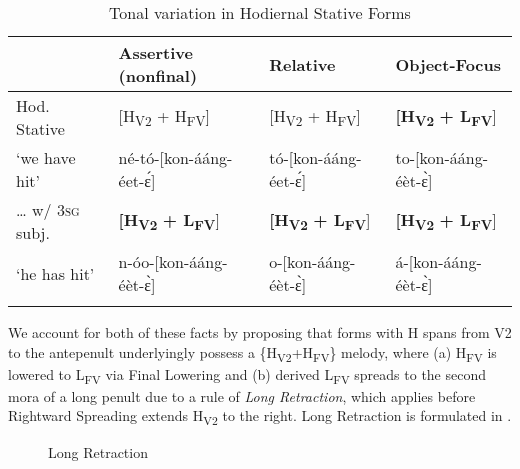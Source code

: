 \documentclass[output=paper,newtxmath,modfonts,nonflat,hidelinks]{langsci/langscibook}
\begin{document}
\begin{table}
\begin{tabularx}{\textwidth}{p{}lll} 
\lsptoprule
&  Assertive (nonfinal) &  Relative &  Object-Focus\\
\midrule
Hod. Stative & [H\textsubscript{V2} + H\textsubscript{FV}] & [H\textsubscript{V2} + H\textsubscript{FV}] & \textbf{[H\textsubscript{V2}} \textbf{+ L\textsubscript{FV}}]\\
‘we have hit’ &
\small né-tó-[kon-ááng-éet-\'ɛ] &
\small tó-[kon-ááng-éet-\'ɛ] &
\small to-[kon-ááng-éèt-\`ɛ]\\
… w/ \textsc{3sg} subj. & \textbf{[H\textsubscript{V2}} \textbf{+ L\textsubscript{FV}}] & \textbf{[H\textsubscript{V2}} \textbf{+ L\textsubscript{FV}}] & \textbf{[H\textsubscript{V2}} \textbf{+ L\textsubscript{FV}}]\\
‘he has hit’ &
\small n-óo-[kon-ááng-éèt-\`ɛ] &
\small o-[kon-ááng-éèt-\`ɛ] &
\small á-[kon-ááng-éèt-\`ɛ]\\
\lspbottomrule
\end{tabularx}
\caption{Tonal variation in Hodiernal Stative Forms}
\label{tab:jones:4}
\end{table}


We account for both of these facts by proposing that forms with H spans from V2 to the antepenult underlyingly possess a \{H\textsubscript{V2}+H\textsubscript{FV}\} melody, where (a) H\textsubscript{FV} is lowered to L\textsubscript{FV} via Final Lowering  and (b) derived L\textsubscript{FV} spreads to the second mora of a long penult due to a rule of \textit{Long Retraction}, which applies before Rightward Spreading extends H\textsubscript{V2} to the right. Long Retraction is formulated in .

  
 
\begin{figure}
\caption{Long Retraction}
\label{fig:jones:1}	
\end{figure}
\end{document}
